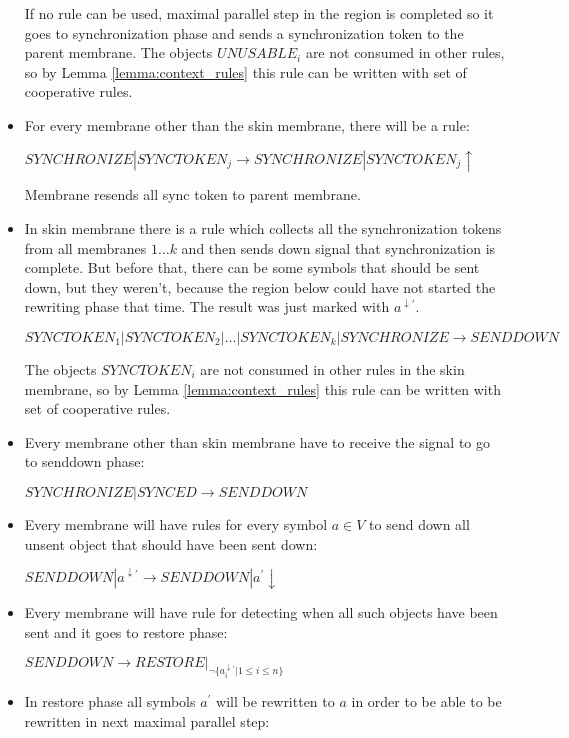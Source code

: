 \begin{dokaz}
\begin{itemize}
    If no rule can be used, maximal parallel step in the region is completed so it goes to synchronization phase and sends a synchronization token to the parent membrane. The objects $UNUSABLE_i$ are not consumed in other rules, so by Lemma \ref{lemma:context_rules} this rule can be written with set of cooperative rules.

    \item For every membrane other than the skin membrane, there will be a rule:

    $SYNCHRONIZE|SYNCTOKEN_j \rightarrow SYNCHRONIZE|SYNCTOKEN_j\uparrow$

    Membrane resends all sync token to parent membrane.

    \item In skin membrane there is a rule which collects all the synchronization tokens from all membranes $1\dots k$ and then sends down signal that synchronization is complete. But before that, there can be some symbols that should be sent down, but they weren't, because the region below could have not started the rewriting phase that time. The result was just marked with $a^{\downarrow\prime}$.

    $SYNCTOKEN_1|SYNCTOKEN_2|\dots|SYNCTOKEN_k|SYNCHRONIZE \rightarrow SENDDOWN$

    The objects $SYNCTOKEN_i$ are not consumed in other rules in the skin membrane, so by Lemma \ref{lemma:context_rules} this rule can be written with set of cooperative rules.

    \item Every membrane other than skin membrane have to receive the signal to go to senddown phase:

    $SYNCHRONIZE|SYNCED \rightarrow SENDDOWN$

    \item Every membrane will have rules for every symbol $a\in V$ to send down all unsent object that should have been sent down:

    $SENDDOWN|a^{\downarrow\prime} \rightarrow SENDDOWN|a^{\prime}\downarrow$

    \item Every membrane will have rule for detecting when all such objects have been sent and it goes to restore phase:

    $SENDDOWN \rightarrow RESTORE|_{\neg \{a_i^{\downarrow\prime}|1\leq i\leq n\}}$

    \item In restore phase all symbols $a^{\prime}$ will be rewritten to $a$ in order to be able to be rewritten in next maximal parallel step:


\end{itemize}
\end{dokaz}
